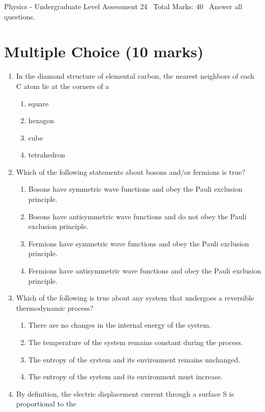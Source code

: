 \documentclass[12pt]{article}
\begin{document}
\begin{center}
Physics - Undergraduate Level Assessment 24 \
Total Marks: 40 \
Answer all questions.
\end{center}

\section*{Multiple Choice (10 marks)}
\begin{enumerate}[label=\arabic*.]
\item In the diamond structure of elemental carbon, the nearest neighbors of each C atom lie at the corners of a
\begin{enumerate}[label=(\alph*)]
    \item square
    \item hexagon
    \item cube
    \item tetrahedron
\end{enumerate}
\item Which of the following statements about bosons and/or fermions is true?
\begin{enumerate}[label=(\alph*)]
    \item Bosons have symmetric wave functions and obey the Pauli exclusion principle.
    \item Bosons have antisymmetric wave functions and do not obey the Pauli exclusion principle.
    \item Fermions have symmetric wave functions and obey the Pauli exclusion principle.
    \item Fermions have antisymmetric wave functions and obey the Pauli exclusion principle.
\end{enumerate}
\item Which of the following is true about any system that undergoes a reversible thermodynamic process?
\begin{enumerate}[label=(\alph*)]
    \item There are no changes in the internal energy of the system.
    \item The temperature of the system remains constant during the process.
    \item The entropy of the system and its environment remains unchanged.
    \item The entropy of the system and its environment must increase.
\end{enumerate}
\item By definition, the electric displacement current through a surface S is proportional to the

\end{enumerate}
\end{document}
